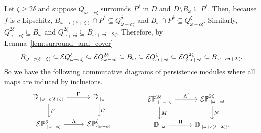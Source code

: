 
Let $\zeta\geq 2\delta$ and suppose $Q_{\omega-c\zeta}$ surrounds $P^\delta$ in $D$ and $D\setminus B_\omega\subseteq P^\delta$.
Then, because $f$ is $c$-Lipschitz, $B_{\omega-c(\delta+\zeta)}\cap P^\delta\subseteq Q_{\omega-c\zeta}^\delta$ and $B_\omega\cap P^\delta\subseteq Q_{\omega+c\delta}^\zeta$.
Similarly, $Q_{\omega-c\zeta}^{2\delta}\subseteq B_\omega$ and $Q_{\omega+c\delta}^{2\zeta}\subseteq B_{\omega+c{\delta+2\zeta}}$.
Therefore, by Lemma~\ref{lem:surround_and_cover}
\[ B_{\omega-c(\delta+\zeta)}\subseteq \mathcal{E} Q_{\omega-c\zeta}^\delta\subseteq\mathcal{E} Q_{\omega-c\zeta}^{2\delta}\subseteq B_\omega
  \subseteq \mathcal{E} Q_{\omega+c\delta}^\zeta\subseteq \mathcal{E} Q_{\omega+c\delta}^{2\zeta}\subseteq B_{\omega+c{\delta+2\zeta}}.\]
So we have the following commutative diagrams of persistence modules where all maps are induced by inclusions.
\[\begin{tikzcd}
    \DD{\omega-c(\delta+\zeta)} \arrow{r}{\Gamma}\arrow{d}{F} &
    \DD{\omega} \arrow{d}{G}\\
    \E\PP{\omega-c\zeta}{\delta}\arrow{r}{\Lambda} &
    \E\PP{\omega+c\delta}{\zeta}
  \end{tikzcd}\hspace{10ex}
  \begin{tikzcd}
    \E\PP{\omega-c\zeta}{2\delta} \arrow{r}{\Lambda'}\arrow{d}{M} &
    \E\PP{\omega+c\delta}{2\zeta}\arrow{d}{N}\\
    \DD{\omega} \arrow{r}{\Pi} &
    \DD{\omega+c(\delta+2\zeta)}.
  \end{tikzcd}\]


